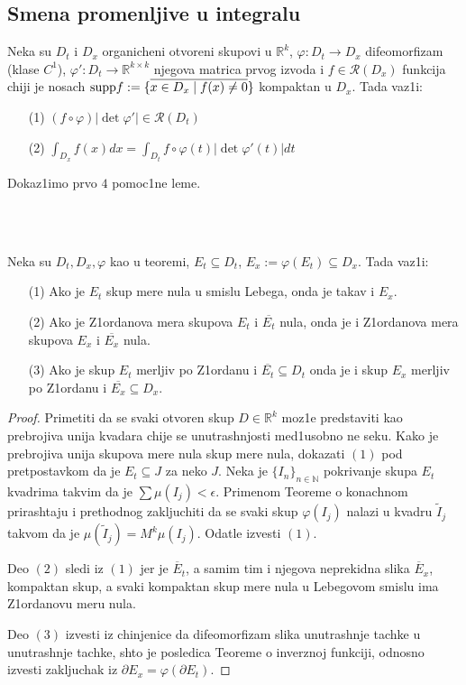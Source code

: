 \documentclass[a4paper,12pt]{article}
\newcommand{\latin}{\fontencoding{T1}\selectfont}
\newcommand{\NN}{\mathbb{N}}
\newcommand{\RR}{\mathbb{R}}
\begin{document}
\subsection{Smena promenljive u integralu}

\begin{tma}
Neka su $D_t$ i $D_x$ organicheni otvoreni skupovi u $\RR^k$, $\varphi: D_t \to D_x$ difeo\-morfizam (klase $C^1$), $\varphi ' : D_t \to \RR^{k \times k}$ njegova matrica prvog izvoda i $f \in \mathcal R (D_x)$ funkcija chiji je nosach $\latin{\textrm{supp}} f := \{\overline{x \in D_x \mid f(x) \ne 0 }\}$ kompaktan u $D_x$. Tada vaz1i:
\begin{itemize}
\item[(1)] $(f \circ \varphi) |\det \varphi ' | \in \mathcal R(D_t)$
\item[(2)] $\int_{D_x} f(x) dx = \int_{D_t} f \circ \varphi(t) |\det \varphi ' (t)| dt$
\end{itemize}
\end{tma}
\begin{nap}
Dokaz1imo prvo $4$ pomoc1ne leme.
\end{nap}
\\ \\
\begin{lema}
Neka su $D_t, D_x, \varphi$ kao u teoremi, $E_t \subseteq D_t$, $E_x := \varphi(E_t) \subseteq D_x$. Tada vaz1i:
\begin{itemize}
\item[(1)] Ako je $E_t$ skup mere nula u smislu Lebega, onda je takav i $E_x$.
\item[(2)] Ako je Z1ordanova mera skupova $E_t$ i $\overline{E_t}$ nula, onda je i Z1ordanova mera skupova $E_x$ i $\overline{E_x}$ nula.
\item[(3)] Ako je skup $E_t$ merljiv po Z1ordanu i $\overline{E_t} \subseteq D_t$ onda je i skup $E_x$ merljiv po Z1ordanu i $\overline{E_x} \subseteq D_x$.
\end{itemize}
\end{lema}
\begin{proof}
Primetiti da se svaki otvoren skup $D \in \RR^k$ moz1e predstaviti kao prebrojiva unija kvadara chije se unutrashnjosti med1usobno ne seku. Kako je prebrojiva unija skupova mere nula skup mere nula, dokazati $(1)$ pod pretpostavkom da je $E_t \subseteq J$ za neko $J$. Neka je $\{ I_n \}_{n \in \NN}$ pokrivanje skupa $E_t$ kvadrima takvim da je $\sum \mu (I_j) < \epsilon$. Primenom Teoreme o konachnom prirashtaju i prethodnog zakljuchiti da se svaki skup $\varphi (I_j) $ nalazi u kvadru $\tilde{I}_j $ takvom da je $\mu (\tilde{I}_j) = M^k \mu (I_j)$. Odatle izvesti $(1)$. 

Deo $(2)$ sledi iz $(1)$ jer je $\overline{E}_t$, a samim tim i njegova neprekidna slika $\overline{E}_x$, kompaktan skup, a svaki kompaktan skup mere nula u Lebegovom smislu ima Z1ordanovu meru nula.

Deo $(3)$ izvesti iz chinjenice da difeomorfizam slika unutrashnje tachke u unutrashnje tachke, shto je posledica Teoreme o inverznoj funkciji, odnosno izvesti zakljuchak iz $\partial E_x = \varphi (\partial E_t)$.
\end{proof}
\end{document}
